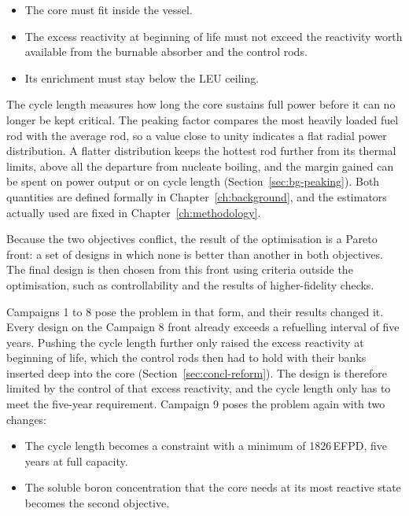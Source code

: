 \begin{itemize}
  \item The core must fit inside the vessel.

  \item The excess reactivity at beginning of life must not exceed the
        reactivity worth available from the burnable absorber and the
        control rods.

  \item Its enrichment must stay below the LEU ceiling.
\end{itemize}

The cycle length measures how long the core sustains full power before
it can no longer be kept critical. The peaking factor compares the most
heavily loaded fuel rod with the average rod, so a value close to unity
indicates a flat radial power distribution. A flatter distribution keeps
the hottest rod further from its thermal limits, above all the departure
from nucleate boiling, and the margin gained can be spent on power
output or on cycle length (Section~\ref{sec:bg-peaking}). Both
quantities are defined formally in Chapter~\ref{ch:background}, and
the estimators actually used are fixed in Chapter~\ref{ch:methodology}.

Because the two objectives conflict, the result of the optimisation is a
Pareto front: a set of designs in which none is better than another in
both objectives. The final design is then chosen from this front using
criteria outside the optimisation, such as controllability and the
results of higher-fidelity checks.

Campaigns 1 to 8 pose the problem in that form, and their results
changed it. Every design on the Campaign 8 front already exceeds a
refuelling interval of five years. Pushing the cycle length further
only raised the excess reactivity at beginning of life, which the
control rods then had to hold with their banks inserted deep into the
core (Section~\ref{sec:concl-reform}). The design is therefore limited
by the control of that excess reactivity, and the cycle length only has
to meet the five-year requirement. Campaign 9 poses the problem again
with two changes:

\begin{itemize}
  \item The cycle length becomes a constraint with a minimum of 1826\,EFPD,
five years at full capacity.

  \item The soluble boron concentration that the core needs at its most
        reactive state becomes the second objective.
\end{itemize}

